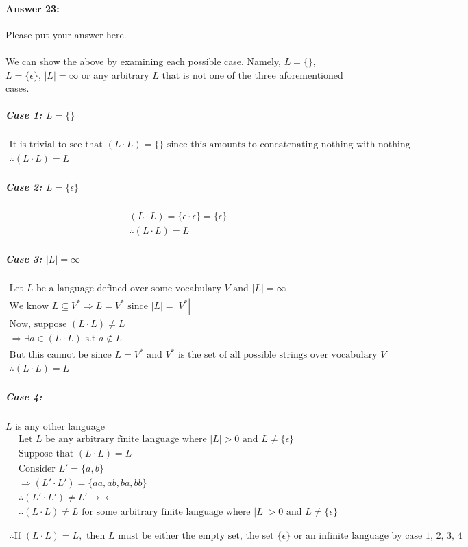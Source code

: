 \documentclass[10pt]{article}
\begin{document}
\paragraph{Answer 23:} Please put your answer here.\\
\noindent \\
We can show the above by examining each possible case. Namely, $L = \{\}$, $L=\{\epsilon\}$, $|L| = \infty$ or any arbitrary $L$ that is not one of the three aforementioned cases.

\subparagraph{Case 1: $L=\{\}$}
\begin{gather*}
    \text{It is trivial to see that } (L\cdot L) = \{\} \text{ since this amounts to concatenating nothing with nothing}\\
    \therefore  (L\cdot L) = L
\end{gather*}

\subparagraph{Case 2: $L=\{\epsilon\}$}
\begin{gather*}
    (L\cdot L) = \{\epsilon \cdot \epsilon\} = \{\epsilon\}\\
    \therefore (L\cdot L) = L
\end{gather*}

\subparagraph{Case 3: $|L| = \infty$}
\begin{gather*}
    \text{Let $L$ be a language defined over some vocabulary $V$ and } |L| = \infty\\
    \text{We know } L \subseteq V^* \Rightarrow L = V^* \text{ since } |L|=|V^*|\\
    \text{Now, suppose } (L\cdot L) \neq L\\
    \Rightarrow \exists a \in (L\cdot L) \text{ s.t } a\notin L \\
    \text{But this cannot be since } L = V^* \text{ and } V^* \text{ is the set of all possible strings over vocabulary } V\\
    \therefore (L\cdot L) = L
\end{gather*}

\subparagraph{Case 4:}$L$ is any other language
\begin{gather*}
    \text{Let $L$ be any arbitrary finite language where } |L| > 0 \text{ and } L \neq \{\epsilon\}\\
    \text{Suppose that } (L\cdot L) = L\\
    \text{Consider } L' = \{a, b\}\\
    \Rightarrow (L'\cdot L') = \{aa, ab, ba, bb\}\\
    \therefore (L'\cdot L') \neq L' \rightarrow \leftarrow \\
    \therefore  (L\cdot L) \neq L \text{ for some arbitrary finite language where } |L| > 0 \text{ and } L \neq \{\epsilon\}
\end{gather*}

\begin{gather*}
    \therefore \text{If } (L\cdot L) = L, \text{ then $L$ must be either the empty set, the set $\{\epsilon\}$ or an infinite language by case 1, 2, 3, 4}
\end{gather*}
\end{document}
